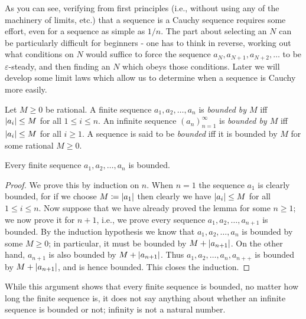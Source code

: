\begin{note}
As you can see, verifying from first principles (i.e., without using any of the machinery of limits, etc.) that a sequence is a Cauchy sequence requires some effort, even for a sequence as simple as \(1 / n\).
The part about selecting an \(N\) can be particularly difficult for beginners
- one has to think in reverse, working out what conditions on \(N\) would suffice to force the sequence \(a_N, a_{N + 1}, a_{N + 2}, \dots\) to be \(\varepsilon\)-steady, and then finding an \(N\) which obeys those conditions.
Later we will develop some limit laws which allow us to determine when a sequence is Cauchy more easily.
\end{note}

\begin{definition}\label{5.1.12}
Let \(M \geq 0\) be rational.
A finite sequence \(a_1, a_2, \dots, a_n\) is \emph{bounded by \(M\)} iff \(\abs*{a_i} \leq M\) for all \(1 \leq i \leq n\).
An infinite sequence \((a_n)_{n = 1}^{\infty}\) is \emph{bounded by \(M\)} iff \(\abs*{a_i} \leq M\) for all \(i \geq 1\).
A sequence is said to be \emph{bounded} iff it is bounded by \(M\) for some rational \(M \geq 0\).
\end{definition}

\setcounter{theorem}{13}
\begin{lemma}\label{5.1.14}
Every finite sequence \(a_1, a_2, \dots, a_n\) is bounded.
\end{lemma}

\begin{proof}
We prove this by induction on \(n\).
When \(n = 1\) the sequence \(a_1\) is clearly bounded, for if we choose \(M \coloneqq \abs*{a_1}\) then clearly we have \(\abs*{a_i} \leq M\) for all \(1 \leq i \leq n\).
Now suppose that we have already proved the lemma for some \(n \geq 1\);
we now prove it for \(n + 1\), i.e., we prove every sequence \(a_1, a_2, \dots, a_{n + 1}\) is bounded.
By the induction hypothesis we know that \(a_1, a_2, \dots, a_n\) is bounded by some \(M \geq 0\);
in particular, it must be bounded by \(M + \abs*{a_{n + 1}}\).
On the other hand, \(a_{n + 1}\) is also bounded by \(M + \abs*{a_{n + 1}}\).
Thus \(a_1, a_2, \dots, a_n, a_{n++}\) is bounded by \(M + \abs*{a_{n + 1}}\), and is hence bounded.
This closes the induction.
\end{proof}

\begin{note}
While this argument shows that every finite sequence is bounded, no matter how long the finite sequence is, it does not say anything about whether an infinite sequence is bounded or not;
infinity is not a natural number.
\end{note}

